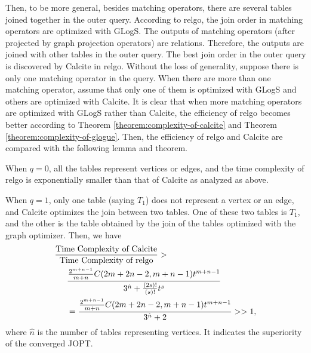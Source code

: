 Then, to be more general, besides matching operators, there are several tables joined together in the outer query.
According to relgo, the join order in matching operators are optimized with GLogS.
The outputs of matching operators (after projected by graph projection operators) are relations.
Therefore, the outputs are joined with other tables in the outer query.
The best join order in the outer query is discovered by Calcite in relgo.
Without the loss of generality, suppose there is only one matching operator in the query.
When there are more than one matching operator, assume that only one of them is optimized with GLogS and others are optimized with Calcite.
It is clear that when more matching operators are optimized with GLogS rather than Calcite, the efficiency of relgo becomes better according to Theorem \ref{theorem:complexity-of-calcite} and Theorem \ref{theorem:complexity-of-glogue}.
Then, the efficiency of relgo and Calcite are compared with the following lemma and theorem.


\iffalse
When $q = 0$, all the tables represent vertices or edges, and the time complexity of relgo is exponentially smaller than that of Calcite as analyzed as above.

When $q = 1$, only one table (saying $T_1$) does not represent a vertex or an edge, and Calcite optimizes the join between two tables.
One of these two tables is $T_1$, and the other is the table obtained by the join of the tables optimized with the graph optimizer.
Then, we have
\begin{equation*}
    \begin{split}
        \frac{\text{Time Complexity of Calcite}}{\text{Time Complexity of relgo}} > \hspace{-12em} & \\
        & \frac{\frac{2^{m+n-1}}{m+n}C(2m+2n-2, m+n-1)t^{m + n - 1}}{3^{\hat{n}} + \frac{(2s)!}{(s)!}t^{s}} \\
        & = \frac{\frac{2^{m+n-1}}{m+n}C(2m+2n-2, m+n-1)t^{m + n - 1}}{3^{\hat{n}} + 2} >> 1,
    \end{split}
\end{equation*}
where $\hat{n}$ is the number of tables representing vertices.
It indicates the superiority of the converged JOPT.


